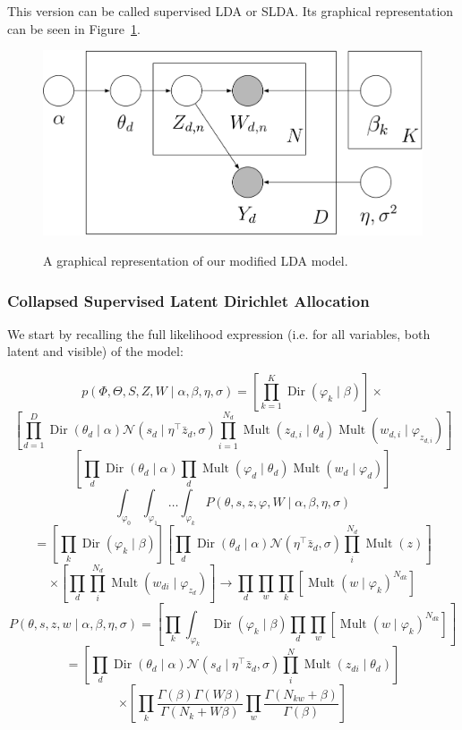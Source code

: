\documentclass[a4paper,10pt]{article}
\DeclareMathOperator{\Dir}{Dir}
\DeclareMathOperator{\Mult}{Mult}
\renewcommand{\phi}{\varphi}
\begin{document}
This version can be called supervised LDA or SLDA.
Its graphical representation can be seen in Figure~\ref{fig:SLDA}.

\begin{figure}[ht!]
  \centering
  \includegraphics[width=\textwidth]{SLDA.png}
  \label{fig:SLDA}
  \caption{A graphical representation of our modified LDA model.}
\end{figure}

\subsubsection{Collapsed Supervised Latent Dirichlet Allocation}

We start by recalling the full likelihood expression (i.e. for all variables, both latent and visible) of the model:

\[ p(\Phi, \Theta, S, Z, W \mid \alpha, \beta, \eta, \sigma) = \left[ \prod_{k = 1}^K \Dir(\phi_k \mid \beta) \right] \times \]
\begin{equation}
 \left[ \prod_{d = 1}^D \Dir(\theta_d \mid \alpha) \mathcal{N}(s_d \mid \eta^\top \bar{z}_d, \sigma) \prod_{i = 1}^{N_d} \Mult(z_{d, i} \mid \theta_d) \Mult(w_{d, i} \mid \varphi_{z_{d, i}}) \right]
\end{equation}
\[\left[ \prod_{d} \Dir(\theta_d \mid \alpha) \prod_d \Mult(\phi_d \mid \theta_d )\Mult(w_d \mid \phi_d)\right]\]
\[\int_{\phi_0}\int_{\phi_1}\dots \int_{\phi_k} P(\theta, s, z, \phi, W \mid \alpha, \beta, \eta, \sigma)\]
\[=\left[ \prod_k \Dir(\phi_k \mid \beta) \right] \left[ \prod_d \Dir(\theta_d \mid \alpha) \mathcal{N}(\eta^\top \bar{z}_d, \sigma) \prod_i^{N_d} \Mult(z) \right]\]
\[\times \left[  \prod_d \prod_i^{N_d} \Mult(w_{di} \mid \phi_{z_d})\right] \rightarrow \prod_d \prod_w \prod_k \left[ \Mult(w \mid \phi_k)^{N_{dk}}\right]\]
\[P(\theta, s, z, w \mid \alpha, \beta, \eta, \sigma) = \left[ \prod_k \int_{\phi_k} \Dir(\phi_k \mid \beta) \prod_d \prod_w \left[ \Mult(w \mid \phi_k)^{N_{dk}}\right] \right]\]
\[ = \left[ \prod_d \Dir(\theta_d \mid \alpha) \mathcal{N}(s_d \mid \eta^\top \bar{z}_d, \sigma) \prod_i^N \Mult(z_{di} \mid \theta_d) \right]\]
\[\times \left[ \prod_k \frac{\Gamma(\beta) \Gamma(W\beta)}{\Gamma(N_k + W\beta)} \prod_w \frac{\Gamma(N_{kw}+\beta)}{\Gamma(\beta)}\right]\]
\end{document}
